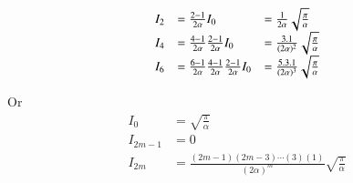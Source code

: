 \begin{align*}
\begin{array}{l l l}
I_2 &= \frac{2-1}{2\alpha} I_0 &= \frac{1}{2\alpha} \sqrt{\frac{\pi}{\alpha}} \\
I_4 &= \frac{4-1}{2\alpha}\frac{2-1}{2\alpha} I_0 &= \frac{3.1}{(2\alpha)^2} \sqrt{\frac{\pi}{\alpha}} \\
I_6 &= \frac{6-1}{2\alpha}\frac{4-1}{2\alpha}\frac{2-1}{2\alpha} I_0 &= \frac{5.3.1}{(2\alpha)^3} \sqrt{\frac{\pi}{\alpha}} \\
\end{array}
\end{align*}

Or
\begin{align}
I_{0} &= \sqrt{\frac{\pi}{\alpha}} \\
I_{2m-1} &= 0 \\
I_{2m} &= \frac{(2m-1)(2m-3)\cdots(3)(1)}{(2\alpha)^m} \sqrt{\frac{\pi}{\alpha}}
\end{align}

%
%

%
